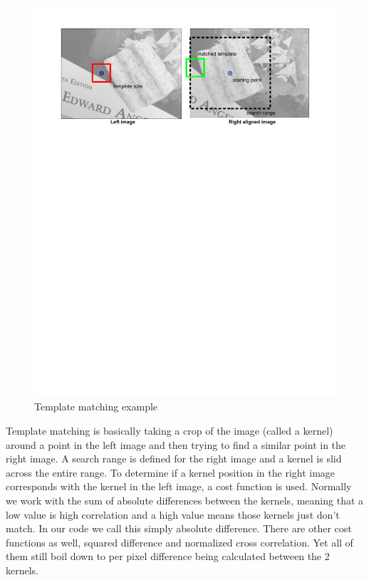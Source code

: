 \begin{figure}[h]
\begin{center}
  \includegraphics[trim = 0in 8in 0in 0in, width=6in]{images/stereo/template_matching.pdf}
\end{center}
  \caption{Template matching example}
  \label{fig:template_matching}
\end{figure}

Template matching is basically taking a crop of the image (called a
kernel) around a point in the left image and then trying to find a
similar point in the right image. A search range is defined for the
right image and a kernel is slid across the entire range. To determine
if a kernel position in the right image corresponds with the kernel in
the left image, a cost function is used. Normally we work with the sum
of absolute differences between the kernels, meaning that a low value
is high correlation and a high value means those kernels just don't
match. In our code we call this simply absolute difference. There are
other cost functions as well, squared difference and normalized cross
correlation. Yet all of them still boil down to per pixel difference
being calculated between the 2 kernels.

